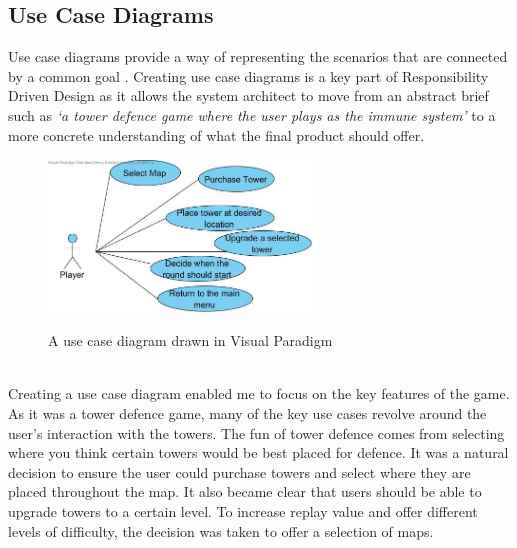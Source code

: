 \documentclass[a4paper,12pt]{article}
\begin{document}
\subsection*{Use Case Diagrams}
Use case diagrams provide a way of representing the scenarios that are connected by a common goal \cite{UML-Distilled}. Creating use case diagrams is a key part of Responsibility Driven Design as it allows the system architect to move from an abstract brief such as \textit{`a tower defence game where the user plays as the immune system'} to a more concrete understanding of what the final product should offer. 
\begin{figure}[h!]
	\begin{center}
		\includegraphics[width=7cm, origin=h]{images/Use-Case.jpg}
		\\
		\caption{A use case diagram drawn in Visual Paradigm}
	\end{center}
\end{figure}
\\
Creating a use case diagram enabled me to focus on the key features of the game. As it was a tower defence game, many of the key use cases revolve around the user's interaction with the towers. The fun of tower defence comes from selecting where you think certain towers would be best placed for defence. It was a natural decision to ensure the user could purchase towers and select where they are placed throughout the map. It also became clear that users should be able to upgrade towers to a certain level. To increase replay value and offer different levels of difficulty, the decision was taken to offer a selection of maps.
\end{document}
